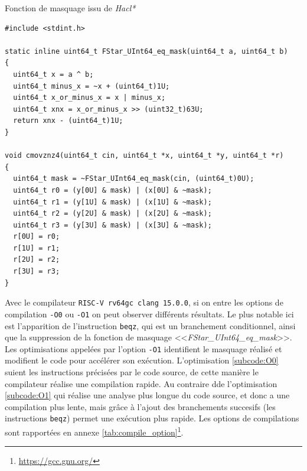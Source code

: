 \begin{listing}[!ht]
    \caption{Fonction de masquage issu de \textit{Hacl*}}
    \label{lst:Hacl_masking}
    \begin{verbatim}
#include <stdint.h>

static inline uint64_t FStar_UInt64_eq_mask(uint64_t a, uint64_t b)
{
  uint64_t x = a ^ b;
  uint64_t minus_x = ~x + (uint64_t)1U;
  uint64_t x_or_minus_x = x | minus_x;
  uint64_t xnx = x_or_minus_x >> (uint32_t)63U;
  return xnx - (uint64_t)1U;
}

void cmovznz4(uint64_t cin, uint64_t *x, uint64_t *y, uint64_t *r)
{
  uint64_t mask = ~FStar_UInt64_eq_mask(cin, (uint64_t)0U);
  uint64_t r0 = (y[0U] & mask) | (x[0U] & ~mask);
  uint64_t r1 = (y[1U] & mask) | (x[1U] & ~mask);
  uint64_t r2 = (y[2U] & mask) | (x[2U] & ~mask);
  uint64_t r3 = (y[3U] & mask) | (x[3U] & ~mask);
  r[0U] = r0;
  r[1U] = r1;
  r[2U] = r2;
  r[3U] = r3;
}
    \end{verbatim}
\end{listing}

Avec le compilateur \texttt{RISC-V rv64gc clang 15.0.0}, si on entre les options de compilation \texttt{-O0} ou \texttt{-O1} on peut observer différents résultats. Le plus notable ici est l'apparition de l'instruction \texttt{beqz}, qui est un branchement conditionnel, ainsi que la suppression de la fonction de masquage <<\textit{FStar\_UInt64\_eq\_mask}>>. Les optimisations appelées par l'option \texttt{-O1} identifient le masquage réalisé et modifient le code pour accélérer son exécution. L'optimisation \ref{subcode:O0} suient les instructions précisées par le code source, de cette manière le compilateur réalise une compilation rapide. Au contraire dde l'optimisation \ref{subcode:O1} qui réalise une analyse plus longue du code source, et donc a une compilation plus lente, mais grâce à l'ajout des branchements succesifs (les instructions \texttt{beqz}) permet une exécution plus rapide. Les options de compilations sont rapportées en annexe \ref{tab:compile_option}\footnote{\url{https://gcc.gnu.org/}}.

